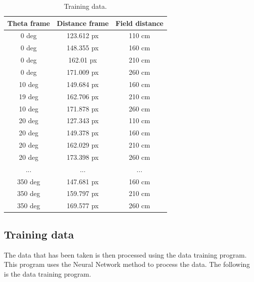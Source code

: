 \begin{table}[htbp]
  \caption{Training data.}
  \begin{center}
  \begin{tabular}{|c|c|c|}
    \hline
    \rowcolor[HTML]{C0C0C0}
    \textbf{Theta frame} & \textbf{Distance frame} & \textbf{Field distance} \\
    \hline
    0 deg            & 123.612 px                & 110 cm            \\
    0 deg           & 148.355 px                & 160 cm            \\
    0 deg           & 162.01 px                & 210 cm            \\
    0 deg           & 171.009 px                & 260 cm           \\
    10 deg           & 149.684 px                & 160 cm           \\
    19 deg           & 162.706 px                & 210 cm           \\
    10 deg           & 171.878 px                & 260 cm           \\
    20 deg           & 127.343 px                & 110 cm           \\
    20 deg           & 149.378 px                & 160 cm           \\
    20 deg           & 162.029 px                & 210 cm           \\
    20 deg           & 173.398 px                & 260 cm           \\
    ...           & ...                & ...           \\
    350 deg           & 147.681 px                & 160 cm           \\
    350 deg           & 159.797 px                & 210 cm           \\
    350 deg           & 169.577 px                & 260 cm           \\
    \hline
  \end{tabular}
  \label{tab1}
  \end{center}
\end{table}


\subsection{Training data
  \label{sec:trainingdata}}

The data that has been taken is then processed using the data training program. This program uses the Neural Network method to process the data. The following is the data training program.

